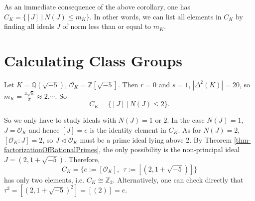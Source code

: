 As an immediate consequence of the above corollary, one has $C_{K}=\{[J]\ |\ N(J) \leq m_{K}\}$. In other words, we can list all elements in $C_{K}$ by finding all ideals $J$ of norm less than or equal to $m_K$.

\section{Calculating Class Groups}
\begin{example}
    Let $K=\mathbb{Q}(\sqrt{-5})$, $\mathcal{O}_{K}=\mathbb{Z}[\sqrt{-5}]$. Then $r=0$ and $s=1$, $\left| \Delta^{2}(K) \right| =20$, so $m_{K}=\frac{4\sqrt{5}}{\pi} \approx 2.\cdots$. So 
    $$C_{K}=\{[J]\ |\ N(J)\leq 2\}.$$ 

    So we only have to study ideals with $N(J) = 1$ or $2$. In the case $N(J)=1$, $J=\mathcal{O}_{K}$ and hence $[J] = e$ is the identity element in $C_K$. As for $N(J)=2$, $[\mathcal{O}_{K}:J]=2$, so $J\lhd \mathcal{O}_{K}$ must be a prime ideal lying above 2. By Theorem \ref{thm-factorizationOfRationalPrimes}, the only possibility is the non-principal ideal $J=(2,1+\sqrt{-5})$. 
    Therefore, 
    $$C_K = \{e:=[\mathcal{O}_K],\ \  \tau:=[(2,1+\sqrt{-5})]\}$$ 
    has only two elements, i.e. $C_{K}\cong \mathbb{Z}_{2}$. Alternatively, one can check directly that
    $\tau^{2}=[(2,1+ \sqrt{-5})^2] = [(2)] =e$. 
\end{example}

